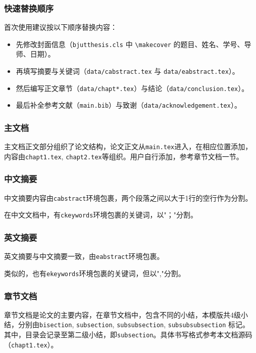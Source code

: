 \subsubsection{快速替换顺序}

首次使用建议按以下顺序替换内容：
\begin{itemize}
  \item 先修改封面信息（\verb|bjutthesis.cls| 中 \verb|\makecover| 的题目、姓名、学号、导师、日期）。
  \item 再填写摘要与关键词（\verb|data/cabstract.tex| 与 \verb|data/eabstract.tex|）。
  \item 然后编写正文章节（\verb|data/chapt*.tex|）与结论（\verb|data/conclusion.tex|）。
  \item 最后补全参考文献（\verb|main.bib|）与致谢（\verb|data/acknowledgement.tex|）。
\end{itemize}

\subsubsection{主文档}

主文档正文部分组织了论文结构，论文正文从\verb|main.tex|进入，在相应位置添加\text{\let\cleardoublepage\clearpage }，内容由\verb |chapt1.tex|, \verb|chapt2.tex|等组织。用户自行添加，参考章节文档一节。%

\subsubsection{中文摘要}

中文摘要内容由\verb|cabstract|环境包裹，两个段落之间以大于1行的空行作为分割。

在中文文档中，有\verb|ckeywords|环境包裹的关键词，以"；"分割。

\subsubsection{英文摘要}

 英文摘要与中文摘要一致，由\verb|eabstract|环境包裹。

 类似的，也有\verb|ekeywords|环境包裹的关键词，但以","分割。

 \subsubsection{章节文档}
 章节文档是论文的主要内容，在章节文档中，包含不同的小结，本模版共4级小结，分别由\verb|bisection|, \verb|subsection|, \verb|subsubsection|,  \verb|subsubsubsection| 标记。
 其中，目录会记录至第二级小结，即\verb|subsection|。具体书写格式参考本文档源码（\verb|chapt1.tex|）。

